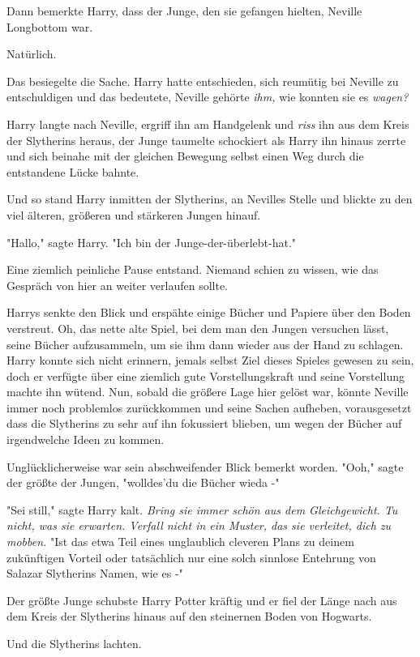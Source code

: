 {Dann bemerkte Harry, dass der Junge, den sie gefangen hielten, Neville Longbottom war.

Natürlich.

Das besiegelte die Sache. Harry hatte entschieden, sich reumütig bei Neville zu entschuldigen und das bedeutete, Neville gehörte \emph{ihm,} wie konnten sie es \emph{wagen?}

Harry langte nach Neville, ergriff ihn am Handgelenk und \emph{riss} ihn aus dem Kreis der Slytherins heraus, der Junge taumelte schockiert als Harry ihn hinaus zerrte und sich beinahe mit der gleichen Bewegung selbst einen Weg durch die entstandene Lücke bahnte.

Und so stand Harry inmitten der Slytherins, an Nevilles Stelle und blickte zu den viel älteren, größeren und stärkeren Jungen hinauf.

"Hallo," sagte Harry. "Ich bin der Junge-der-überlebt-hat."

Eine ziemlich peinliche Pause entstand. Niemand schien zu wissen, wie das Gespräch von hier an weiter verlaufen sollte.

Harrys senkte den Blick und erspähte einige Bücher und Papiere über den Boden verstreut. Oh, das nette alte Spiel, bei dem man den Jungen versuchen lässt, seine Bücher aufzusammeln, um sie ihm dann wieder aus der Hand zu schlagen. Harry konnte sich nicht erinnern, jemals selbst Ziel dieses Spieles gewesen zu sein, doch er verfügte über eine ziemlich gute Vorstellungskraft und seine Vorstellung machte ihn wütend. Nun, sobald die größere Lage hier gelöst war, könnte Neville immer noch problemlos zurückkommen und seine Sachen aufheben, vorausgesetzt dass die Slytherins zu sehr auf ihn fokussiert blieben, um wegen der Bücher auf irgendwelche Ideen zu kommen.

Unglücklicherweise war sein abschweifender Blick bemerkt worden. "Ooh," sagte der größte der Jungen, "wolldes'du die Bücher wieda -"

"Sei still," sagte Harry kalt. \emph{Bring sie immer schön aus dem Gleichgewicht. Tu nicht, was sie erwarten. Verfall nicht in ein Muster, das sie verleitet, dich zu mobben.} "Ist das etwa Teil eines unglaublich cleveren Plans zu deinem zukünftigen Vorteil oder tatsächlich nur eine solch sinnlose Entehrung von Salazar Slytherins Namen, wie es -"

Der größte Junge schubste Harry Potter kräftig und er fiel der Länge nach aus dem Kreis der Slytherins hinaus auf den steinernen Boden von Hogwarts.

Und die Slytherins lachten.

}
